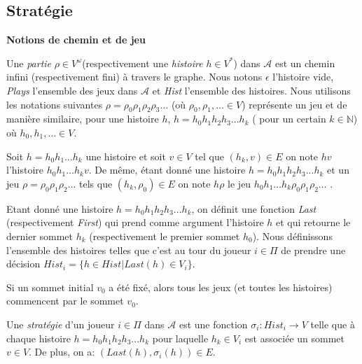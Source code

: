 \subsection{Stratégie}

\noindent\textbf{Notions de chemin et de jeu}

Une \textit{partie} $\rho \in V^{\omega}$(respectivement une \textit{histoire} $h \in V^{*}$) dans $\mathcal{A}$ est un chemin infini (respectivement fini) à travers le graphe. Nous notons $\epsilon$ l'histoire vide, \textit{Plays} l'ensemble des jeux dans $\mathcal{A}$ et \textit{Hist} l'ensemble des histoires. Nous utilisons les notations suivantes $\rho = \rho _{0}  \rho _{1} \rho _{2}\rho _{3} \ldots$ (où $\rho _{0},  \rho _{1},\ldots \in V$)  représente un jeu et de manière similaire, pour une histoire $h$, $ h = h_{0} h_{1} h_{2} h_{3} ... h_{k}$ ( pour un certain $k \in \mathbb{N}$) où  $h_{0}, h_{1}, \ldots \in V$.

 Soit $ h = h_{0} h_{1} \ldots h_{k}$ une histoire et soit $v \in V$ tel que $(h_{k},v)\in E$ on note $hv$ l'histoire $h_{0} h_{1} \ldots h_{k}v$. De même, étant donné une histoire $ h = h_{0} h_{1} h_{2} h_{3} ... h_{k}$ et un jeu $\rho = \rho _{0}  \rho _{1} \rho _{2} \ldots$ tels que $(h_{k},\rho_{0})\in E$ on note $h\rho$ le jeu $ h_{0} h_{1} \ldots h_{k}\rho _{0}  \rho _{1} \rho _{2} \ldots$ .

Etant donné une histoire $ h = h_{0} h_{1} h_{2} h_{3} ... h_{k}$,  on définit une fonction \textit{Last} (respectivement \textit{First}) qui prend comme argument l'histoire $h$ et qui retourne le dernier sommet $h_{k}$ (respectivement le premier sommet $h_{0}$). Nous définissons l'ensemble des histoires telles que c'est au tour du joueur $i \in \Pi$ de prendre une décision $Hist_{i} = \{ h \in Hist | Last(h) \in V_{i} \}$.

\begin{rem}
	Si un sommet initial $v_{0}$ a été fixé, alors tous les jeux (et toutes les histoires) commencent par le sommet $v_{0}.$\\
\end{rem}


\begin{defi}[Stratégie]
	Une \textit{stratégie} d'un joueur $i \in \Pi$ dans $\mathcal{A}$ est une fonction \mbox{$\sigma _{i}: Hist_{i} \rightarrow V$} telle que à chaque histoire $ h = h_{0} h_{1} h_{2} h_{3} ... h_{k}$ pour laquelle $h_{k} \in V_{i}$ est associée un sommet $v \in V$. De plus, on a: $(Last(h),\sigma _{i}(h))\in E$.
\end{defi}

